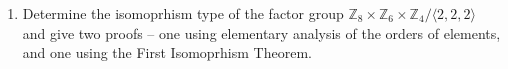 
\usepackage{amsmath, amssymb, dsfont}

\newenvironment{amatrix}[1]{%
  \left(\begin{array}{@{}*{#1}{c}|c@{}}
}{%
  \end{array}\right)
}

\makeatletter
\renewcommand*\env@matrix[1][*\c@MaxMatrixCols c]{%
  \hskip -\arraycolsep
  \let\@ifnextchar\new@ifnextchar
  \array{#1}}
\makeatother

\newcommand{\?}{\stackrel{?}{=}}



\pagestyle{myheadings}


\begin{enumerate}
\item Determine the isomoprhism type of the factor group $\mathds{Z}_8 \times \mathds{Z}_6 \times \mathds{Z}_4 / \langle 2,2,2 \rangle$ and give two proofs -- one using elementary analysis of the orders of elements, and one using the First Isomoprhism Theorem.\\\\


\end{enumerate}
